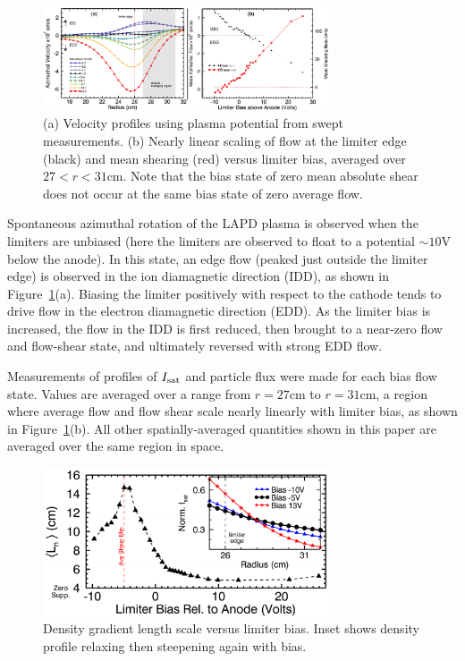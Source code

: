 \documentclass[aps,prl,amsmath,amssymb,preprint,superscriptaddress]{revtex4}
\begin{document}
\begin{figure}[!htbp]
\centerline{
\includegraphics[width=8.5cm]{velocity_flowshear}}
\caption{\label{fig:velocity_flowshear} (a) Velocity profiles using plasma potential from swept measurements. (b) Nearly linear scaling of flow at the limiter edge (black) and mean shearing (red) versus limiter bias, averaged over $27 < r < 31$cm. Note that the bias state of zero mean absolute shear does not occur at the same bias state of zero average flow.}
\end{figure}

Spontaneous azimuthal rotation of the LAPD plasma is observed when the limiters are
unbiased (here the limiters are observed to float to a
potential $\sim 10$V below the anode).  In this state, an edge flow
(peaked just outside the limiter edge) is
observed in the ion diamagnetic direction (IDD), as shown in
Figure~\ref{fig:velocity_flowshear}(a).  Biasing the limiter positively
with respect to the cathode tends to drive flow in the electron
diamagnetic direction (EDD).  As the limiter bias is increased, the
flow in the IDD is first reduced, then brought to a near-zero flow
and flow-shear state, and ultimately reversed with strong EDD flow.

Measurements of profiles of $I_{\rm sat}$ and particle flux
were made for each bias flow state. Values are averaged over a range
from $r=27$cm to $r=31$cm, a region where average flow and flow shear scale
nearly linearly with limiter bias, as shown in
Figure~\ref{fig:velocity_flowshear}(b).  All other spatially-averaged
quantities shown in this paper are averaged over the same region in space.

\begin{figure}[!htbp]
\centerline{
\includegraphics[width=8.5cm]{densgrad}}
\caption{\label{fig:densgrad} Density gradient length scale versus limiter bias. Inset shows density profile relaxing then steepening again with bias.}
\end{figure}
\end{document}
